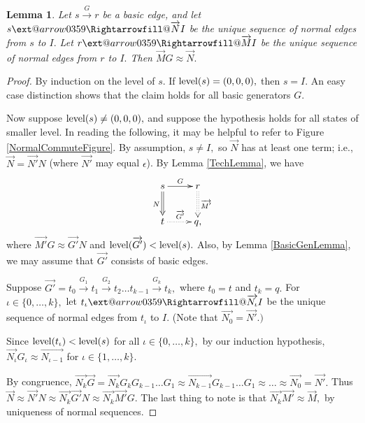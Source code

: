 \documentclass{dalthesis}
\makeatletter
\theoremstyle{theorem}
\newtheorem{lemma}[theorem]{Lemma}
\theoremstyle{definition}
\theoremstyle{definition}  %
\theoremstyle{definition}
\newcommand{\kay}{k}
\renewcommand{\:}{\mathbin{:}}
\newcommand{\xRightarrow}[2][]{\ext@arrow
  0359\Rightarrowfill@{#1}{#2}}
\newcommand{\level}{\mathop{\rm level}\nolimits}
\newcommand{\edge}{\xrightarrow}
\newcommand{\nedge}{\xRightarrow}
\renewcommand{\vec}{\overrightarrow}
\makeatother
\begin{document}
\begin{lemma}
\label{NormalCommuteLemma}
Let $s\edge{G}r$ be a basic edge, and let $s\nedge{\vec{N}}I$ be the unique sequence of normal edges from $s$ to $I.$ Let $r\nedge{\vec{M}}I$ be the unique sequence of normal edges from $r$ to $I.$ Then $\vec{M}G\approx\vec{N}.$
\end{lemma}
\begin{proof}
By induction on the level of $s.$ If $\level(s) = (0,0,0),$ then $s = I.$ An easy case distinction shows that the claim holds for all basic generators $G.$

Now suppose $\level(s)\neq(0,0,0),$ and suppose the hypothesis holds for all states of smaller level. In reading the following, it may be helpful to refer to Figure \ref{NormalCommuteFigure}. By assumption, $s\neq I,$ so $\vec{N}$ has at least one term; i.e., $\vec{N} = \vec{N'}N$ (where $\vec{N'}$ may equal $\epsilon$).  By Lemma \ref{TechLemma}, we have\[ \xymatrix{
    s \ar@{=>}[d]_{N} \ar[r]^{G} &
    r \ar@{:>}[d]^{\vec{M'}} \\
    t \ar@{.>}[r]^{\vec{G'}} &
    q,
  }
  \]
  where $\vec{M'}G\approx\vec{G'}N$ and $\level(\vec{G'})<\level(s).$ Also, by Lemma \ref{BasicGenLemma}, we may assume that $\vec{G'}$ consists of basic edges.
  
  Suppose $\vec{G'} = t_0\edge{G_1}t_1\edge{G_2}t_2\ldots t_{\kay-1}\edge{G_{\kay}}t_{\kay},$ where $t_0 = t$ and $t_{\kay} = q.$ For $\iota\in\{0,\ldots ,\kay\},$ let $t_\iota\nedge{\vec{N_\iota}}I$ be the unique sequence of normal edges from $t_\iota$ to $I.$ (Note that $\vec{N_0} = \vec{N'}.)$
  
  Since $\level(t_\iota)<\level(s)$ for all $\iota\in\{0,\ldots ,\kay\},$ by our induction hypothesis, $\vec{N_\iota}G_\iota\approx\vec{N_{\iota-1}}$ for $\iota\in\{1,\ldots ,\kay\}.$ 
  
By congruence, $\vec{N_{\kay}}\vec{G} = \vec{N_{\kay}}G_{\kay}G_{\kay-1}\ldots G_1\approx\vec{N_{\kay-1}}G_{\kay-1}\ldots G_1\approx\ldots \approx\vec{N_0} = \vec{N'}.$ Thus $\vec{N}\approx\vec{N'}N\approx\vec{N_{\kay}}\vec{G'}N\approx\vec{N_{\kay}}\vec{M'}G.$ The last thing to note is that $\vec{N_{\kay}}\vec{M'}\approx\vec{M},$ by uniqueness of normal sequences. 
\end{proof}
\end{document}
